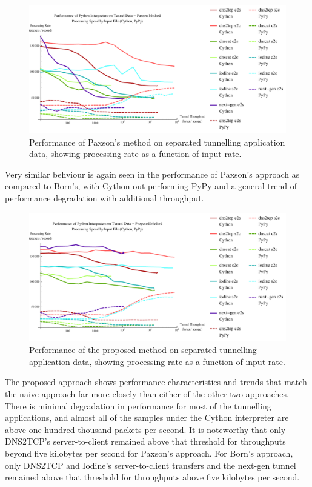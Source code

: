 \documentclass[12pt]{report}
\theoremstyle{remark}
\theoremstyle{definition}
\theoremstyle{definition}
\theoremstyle{definition}
\begin{document}
\begin{figure}
\centering
\includegraphics[width=\textwidth]{../figures/ppia-paxson.pdf}
\caption[Performance of Paxson's Method on Tunnel Data by Python
Interpreter]{Performance of Paxson's method on separated tunnelling application
data, showing processing rate as a function of input rate.}
\label{ppia-paxson}
\end{figure}

Very similar behviour is again seen in the performance of Paxson's approach as
compared to Born's, with Cython out-performing PyPy and a general
trend of performance degradation with additional throughput.

\begin{figure}
\centering
\includegraphics[width=\textwidth]{../figures/ppia-proposed.pdf}
\caption[Performance of the Proposed Method on Tunnel Data by Python
Interpreter]{Performance of the proposed method on separated tunnelling
application data, showing processing rate as a function of input rate.}
\label{ppia-proposed}
\end{figure}

The proposed approach shows performance characteristics and trends that match
the naive approach far more closely than either of the other two approaches.
There is minimal degradation in performance for most of the tunnelling
applications, and almost all of the samples under the Cython interpreter are
above one hundred thousand packets per second. It is noteworthy that only
DNS2TCP's server-to-client remained above that threshold for throughputs beyond
five kilobytes per second for Paxson's approach. For Born's approach, only
DNS2TCP and Iodine's server-to-client transfers and the next-gen tunnel remained
above that threshold for throughputs above five kilobytes per second.
\end{document}
